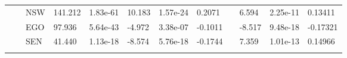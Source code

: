 \documentclass[11pt, a4paper]{article}
\begin{document}
\begin{landscape}
\begin{ThreePartTable}
\begin{tabular}{L{1.5cm} L{2cm} L{1.5cm} L{2cm} L{2cm} p{1.5cm} p{1.5cm} p{1.5cm} p{0.1cm} p{1.5cm} p{1.5cm} p{1.5cm}}
		&&NSW&141.212& 1.83e-61&10.183&1.57e-24& 0.2071&& 6.594&2.25e-11& 0.13411\\
		 &&EGO&97.936& 5.64e-43&-4.972&3.38e-07&-0.1011&&-8.517&9.48e-18&-0.17321\\
		 &&SEN&41.440& 1.13e-18&-8.574&5.76e-18&-0.1744&& 7.359&1.01e-13& 0.14966\\
		\midrule[0.25mm]\\[-25pt]
	\end{tabular}
\end{ThreePartTable}
\end{landscape}
\end{document}
